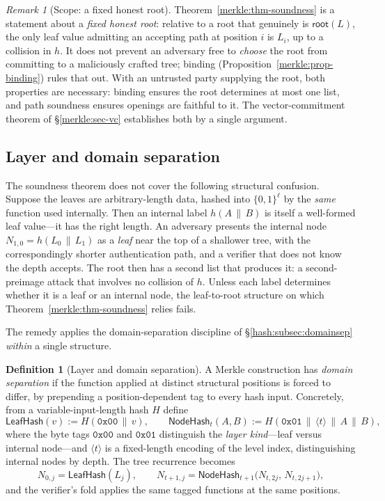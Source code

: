 \documentclass[11pt,a4paper]{article}
\theoremstyle{definition}
\newtheorem{definition}[theorem]{Definition}
\theoremstyle{remark}
\newtheorem{remark}[theorem]{Remark}
\begin{document}
\begin{remark}[Scope: a fixed honest root]
\label{merkle:rem-soundness-scope}
Theorem~\ref{merkle:thm-soundness} is a statement about a \emph{fixed
honest root}: relative to a root that genuinely is
\(\mathsf{root}(L)\), the only leaf value admitting an accepting path
at position \(i\) is \(L_i\), up to a collision in \(h\). It does not
prevent an adversary free to \emph{choose} the root from committing to
a maliciously crafted tree; binding
(Proposition~\ref{merkle:prop-binding}) rules that out. With an
untrusted party supplying the root, both properties are necessary:
binding ensures the root determines at most one list, and path
soundness ensures openings are faithful to it. The vector-commitment
theorem of \S\ref{merkle:sec-vc} establishes both by a single argument.
\end{remark}

\subsection{Layer and domain separation}\label{merkle:sec-domain}

The soundness theorem does not cover the following structural
confusion. Suppose the leaves are arbitrary-length data, hashed into
\(\{0,1\}^{\ell}\) by the \emph{same} function used internally. Then an
internal label \(h(A \,\|\, B)\) is itself a well-formed leaf value---it
has the right length. An adversary presents the internal node
\(N_{1,0} = h(L_0 \,\|\, L_1)\) as a \emph{leaf} near the top of a
shallower tree, with the correspondingly shorter authentication path,
and a verifier that does not know the depth accepts. The root then has
a second list that produces it: a second-preimage attack that involves
no collision of \(h\). Unless each label determines whether it is a
leaf or an internal node, the leaf-to-root structure on which
Theorem~\ref{merkle:thm-soundness} relies fails.

The remedy applies the domain-separation discipline of
\S\ref{hash:subsec:domainsep} \emph{within} a single structure.

\begin{definition}[Layer and domain separation]\label{merkle:def-domain}
A Merkle construction has \emph{domain separation} if the function
applied at distinct structural positions is forced to differ, by
prepending a position-dependent tag to every hash input.
Concretely, from a variable-input-length hash \(H\) define
\[
\mathsf{LeafHash}(v) := H(\mathtt{0x00} \,\|\, v),
\qquad
\mathsf{NodeHash}_t(A, B) :=
H(\mathtt{0x01} \,\|\, \langle t \rangle \,\|\, A \,\|\, B),
\]
where the byte tags \(\mathtt{0x00}\) and \(\mathtt{0x01}\)
distinguish the \emph{layer kind}---leaf versus internal node---and
\(\langle t \rangle\) is a fixed-length encoding of the level index,
distinguishing internal nodes by depth. The tree recurrence becomes
\[
N_{0,j} = \mathsf{LeafHash}(L_j),
\qquad
N_{t+1,j} = \mathsf{NodeHash}_{t+1}\bigl(N_{t,2j},\, N_{t,2j+1}\bigr),
\]
and the verifier's fold applies the same tagged functions at the same
positions.
\end{definition}
\end{document}
